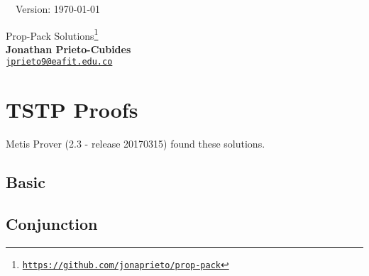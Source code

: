 \documentclass[12pt]{article}
\newcommand{\solutiontstp}[2][c]{}
\begin{document}

\hrulefill\ \ Version: \today\\

\vspace{3mm}
\begin{center}
{\Large Prop-Pack Solutions\footnote{
\href{https://github.com/jonaprieto/prop-pack}{{\color{blue(munsell)}
\texttt{https://github.com/jonaprieto/prop-pack}}}}
}\\
\textbf{Jonathan Prieto-Cubides}\\ %
\href{mailto:jprieto9@eafit.edu.co}{{\color{blue(munsell)}\texttt{jprieto9@eafit.edu.co}}}
\end{center}
\vspace{0.1 cm}

\tableofcontents

\section{TSTP Proofs}
Metis Prover (2.3 - release 20170315) found these solutions.
\subsection{Basic}
\solutiontstp[basic-1.tptp]{problems/basic/basic-1.tstp}
\solutiontstp[basic-2.tptp]{problems/basic/basic-2.tstp}
\solutiontstp[basic-3.tptp]{problems/basic/basic-3.tstp}
\solutiontstp[basic-4.tptp]{problems/basic/basic-4.tstp}

\subsection{Conjunction}
\solutiontstp[conj-1.tptp]{problems/conjunction/conj-1.tstp}
\solutiontstp[conj-2.tptp]{problems/conjunction/conj-2.tstp}
\solutiontstp[conj-3.tptp]{problems/conjunction/conj-3.tstp}
\solutiontstp[conj-4.tptp]{problems/conjunction/conj-4.tstp}
\solutiontstp[conj-5.tptp]{problems/conjunction/conj-5.tstp}
\solutiontstp[conj-6.tptp]{problems/conjunction/conj-6.tstp}
\end{document}
